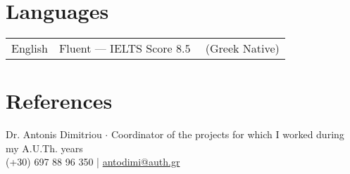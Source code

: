 \documentclass[a4paper,10pt,twoside]{article}
\begin{document}

\section{Languages}

\begin{tabular}{rp{12cm}}
  English & Fluent --- IELTS Score $8.5$ \ \ (Greek Native)
\end{tabular}

\vspace{0.2cm}
\section{References}
\noindent Dr. Antonis Dimitriou $\cdot$ Coordinator of the projects for which I worked during my A.U.Th. years \\
  (+30) 697 88 96 350 | \href{mailto:antodimi@auth.gr}{antodimi@auth.gr}
\end{document}
